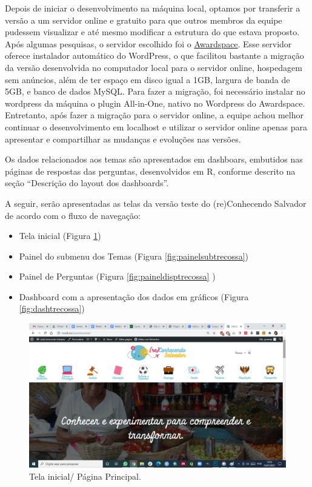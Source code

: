 \documentclass[
]{book}
\providecommand{\tightlist}{%
  \setlength{\itemsep}{0pt}\setlength{\parskip}{0pt}}
\begin{document}
Depois de iniciar o desenvolvimento na máquina local, optamos por transferir a versão a um servidor online e gratuito para que outros membros da equipe pudessem visualizar e até mesmo modificar a estrutura do que estava proposto. Após algumas pesquisas, o servidor escolhido foi o \href{https://www.awardspace.com/}{Awardspace}. Esse servidor oferece instalador automático do WordPress, o que facilitou bastante a migração da versão desenvolvida no computador local para o servidor online, hospedagem sem anúncios, além de ter espaço em disco igual a 1GB, largura de banda de 5GB, e banco de dados MySQL. Para fazer a migração, foi necessário instalar no wordpress da máquina o plugin All-in-One, nativo no Wordpress do Awardspace. Entretanto, após fazer a migração para o servidor online, a equipe achou melhor continuar o desenvolvimento em localhost e utilizar o servidor online apenas para apresentar e compartilhar as mudanças e evoluções nas versões.

Os dados relacionados aos temas são apresentados em dashboars, embutidos nas páginas de respostas das perguntas, desenvolvidos em R, conforme descrito na seção ``Descrição do layout dos dashboards''.

A seguir, serão apresentadas as telas da versão teste do (re)Conhecendo Salvador de acordo com o fluxo de navegação:

\begin{itemize}
\tightlist
\item
  Tela inicial (Figura \ref{fig:teleinicialtrecossa})
\item
  Painel do submenu dos Temas (Figura \ref{fig:painelsubtrecossa})
\item
  Painel de Perguntas (Figura \ref{fig:paineldisptrecossa} )
\item
  Dashboard com a apresentação dos dados em gráficos (Figura \ref{fig:dashtrecossa})
\end{itemize}

\begin{figure}
\includegraphics[width=1\linewidth]{images/image61} \caption{Tela inicial/ Página Principal.}\label{fig:teleinicialtrecossa}
\end{figure}
\end{document}
